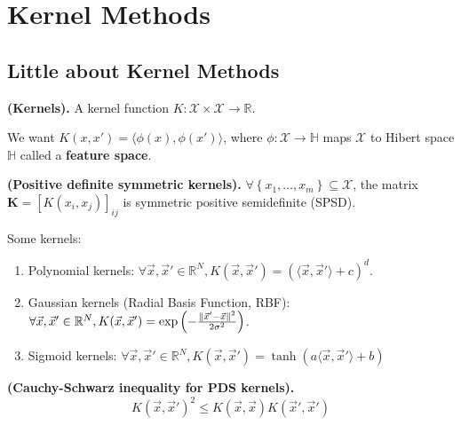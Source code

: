 
\section{Kernel Methods}%

\subsection{Little about Kernel Methods}%
\label{sub:little_about_kernel_methods}

\begin{definition}
    \textbf{(Kernels).}
    A kernel function $ K: \mathcal{X} \times \mathcal{X} \rightarrow \mathbb{R}$.
\end{definition}
We want $ K(x, x') = \langle \phi(x), \phi(x') \rangle $, where $ \phi: \mathcal{X}\rightarrow \mathbb{H} $ maps $ \mathcal{X} $ to Hibert space $ \mathbb{H} $ called a \textbf{feature space}.

\begin{definition}
    \textbf{(Positive definite symmetric kernels).}
    $ \forall \left\{ x_1, \ldots, x_m \right\} \subseteq \mathcal{X} $,
    the matrix $ \textbf{K} = {[K(x_i, x_j)]}_{ij} $ is symmetric positive semidefinite (SPSD).
\end{definition}

\begin{example}
    Some kernels:\\
    \begin{enumerate}
        \item Polynomial kernels: $ \forall \vec{x}, \vec{x}' \in \mathbb{R}^N, K(\vec{x},\vec{x}') = {(\langle \vec{x}, \vec{x}' \rangle+c)}^d $.
        \item Gaussian kernels (Radial Basis Function, RBF): $ \forall \vec{x}, \vec{x}' \in \mathbb{R}^N, K(\vec{x},\vec{x}') = \exp \left( - \frac{ \Arrowvert \vec{x}' - \vec{x} \Arrowvert^2}{2 \sigma^2}  \right)$.
        \item Sigmoid kernels: $ \forall \vec{x}, \vec{x}' \in \mathbb{R}^N, K(\vec{x},\vec{x}') = \tanh \left( a \langle \vec{x}, \vec{x}' \rangle+b \right)$
    \end{enumerate}
\end{example}

\begin{lemma}
    \textbf{(Cauchy-Schwarz inequality for PDS kernels).}
    \[
         {K(\vec{x}, \vec{x}')}^2 \le K(\vec{x}, \vec{x})K(\vec{x}', \vec{x}') 
    \]
\end{lemma}

